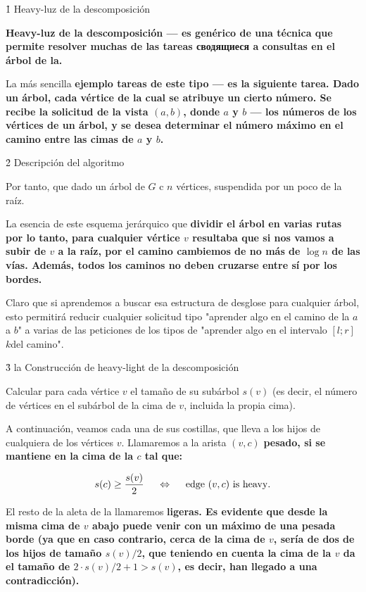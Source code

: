 \h1{ Heavy-luz de la descomposición }

\bf{Heavy-luz de la descomposición} --- es genérico de una técnica que permite resolver muchas de las tareas сводящиеся a \bf{consultas en el árbol de la}.

La más sencilla \bf{ejemplo} tareas de este tipo --- es la siguiente tarea. Dado un árbol, cada vértice de la cual se atribuye un cierto número. Se recibe la solicitud de la vista $(a,b)$, donde $a$ y $b$ --- los números de los vértices de un árbol, y se desea determinar el número máximo en el camino entre las cimas de $a$ y $b$.


\h2{ Descripción del algoritmo }

Por tanto, que dado un árbol de $G$ c $n$ vértices, suspendida por un poco de la raíz.

La esencia de este esquema jerárquico que \bf{dividir el árbol en varias rutas} por lo tanto, para cualquier vértice $v$ resultaba que si nos vamos a subir de $v$ a la raíz, por el camino cambiemos de no más de $\log n$ de las vías. Además, todos los caminos no deben cruzarse entre sí por los bordes.

Claro que si aprendemos a buscar esa estructura de desglose para cualquier árbol, esto permitirá reducir cualquier solicitud tipo "aprender algo en el camino de la $a$ a $b$" a varias de las peticiones de los tipos de "aprender algo en el intervalo $[l;r]$ $k$del camino".


\h3{ la Construcción de heavy-light de la descomposición }

Calcular para cada vértice $v$ el tamaño de su subárbol $s(v)$ (es decir, el número de vértices en el subárbol de la cima de $v$, incluida la propia cima).

A continuación, veamos cada una de sus costillas, que lleva a los hijos de cualquiera de los vértices $v$. Llamaremos a la arista $(v,c)$ \bf{pesado}, si se mantiene en la cima de la $c$ tal que:

$$ s(c) \ge \frac{ s(v) }{ 2 } ~~~~ \Leftrightarrow ~~~~ {\rm edge} ~ (v,c) ~ {\rm is ~ heavy}. $$

El resto de la aleta de la llamaremos \bf{ligeras}. Es evidente que desde la misma cima de $v$ abajo puede venir con un máximo de una pesada borde (ya que en caso contrario, cerca de la cima de $v$, sería de dos de los hijos de tamaño $s(v)/2$, que teniendo en cuenta la cima de la $v$ da el tamaño de $2 \cdot s(v) / 2 + 1 > s(v)$, es decir, han llegado a una contradicción).

